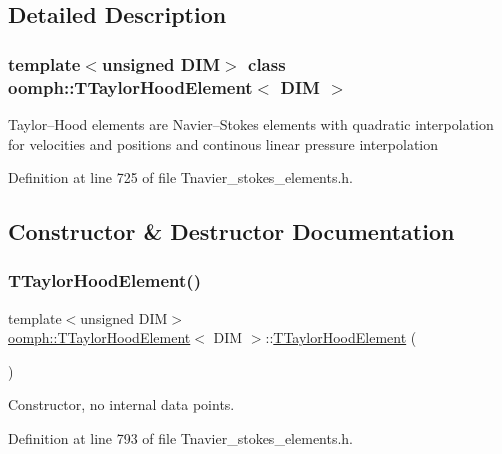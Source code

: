 \subsection{Detailed Description}
\subsubsection*{template$<$unsigned D\+IM$>$\newline
class oomph\+::\+T\+Taylor\+Hood\+Element$<$ D\+I\+M $>$}

Taylor--Hood elements are Navier--Stokes elements with quadratic interpolation for velocities and positions and continous linear pressure interpolation 

Definition at line 725 of file Tnavier\+\_\+stokes\+\_\+elements.\+h.



\subsection{Constructor \& Destructor Documentation}
\mbox{\label{classoomph_1_1TTaylorHoodElement_a0b7cf5da6700fe2566cdf69ea5af3506}} 
\subsubsection{\texorpdfstring{T\+Taylor\+Hood\+Element()}{TTaylorHoodElement()}\hspace{0.1cm}{\footnotesize\ttfamily [1/2]}}
{\footnotesize\ttfamily template$<$unsigned D\+IM$>$ \\
\hyperlink{classoomph_1_1TTaylorHoodElement}{oomph\+::\+T\+Taylor\+Hood\+Element}$<$ D\+IM $>$\+::\hyperlink{classoomph_1_1TTaylorHoodElement}{T\+Taylor\+Hood\+Element} (\begin{DoxyParamCaption}{ }\end{DoxyParamCaption})\hspace{0.3cm}{\ttfamily [inline]}}



Constructor, no internal data points. 



Definition at line 793 of file Tnavier\+\_\+stokes\+\_\+elements.\+h.

